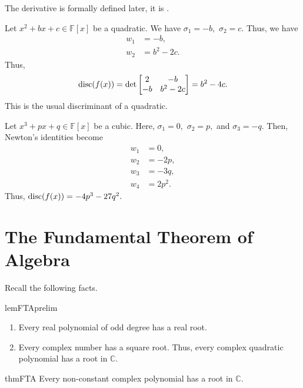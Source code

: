 The derivative is formally defined later, it is .

\begin{ex}
    Let $x^2 + bx + c \in \mathbb{F}[x]$ be a quadratic. We have $\sigma_1 = -b,$ $\sigma_2 = c.$ Thus, we have
    \begin{align*} 
        w_1 &= -b,\\
        w_2 &= b^2 - 2c.
    \end{align*}
    Thus,
    \begin{equation*} 
        \operatorname{disc}(f(x)) = \det\begin{bmatrix}
            2 & -b\\
            -b & b^2 - 2c
        \end{bmatrix} = b^2 - 4c.
    \end{equation*}
    This is the usual discriminant of a quadratic.
\end{ex}

\begin{ex} \label{ex:disccubic}
    Let $x^3 + px + q \in \mathbb{F}[x]$ be a cubic. Here, $\sigma_1 = 0,$ $\sigma_2 = p,$ and $\sigma_3 = -q.$ Then, Newton's identities become
    \begin{align*} 
        w_1 &= 0,\\
        w_2 &= -2p,\\
        w_3 &= -3q,\\
        w_4 &= 2p^2.
    \end{align*}
    Thus, $\operatorname{disc}(f(x)) = -4p^3 - 27q^2.$
\end{ex}

\section{The Fundamental Theorem of Algebra}

Recall the following facts.

\begin{restatable}[]{lem}{FTAprelim}
\label{lem:FTAprelim}
    \phantom{hi}
    \begin{enumerate}
        \item Every real polynomial of odd degree has a real root.
        \item Every complex number has a square root. Thus, every complex quadratic polynomial has a root in $\mathbb{C}.$ \hfill\hyperref[lem:FTAprelim2]{\downsym}
    \end{enumerate} 
\end{restatable}

\begin{restatable}{thm}{FTA}
\label{thm:FTA}
    Every non-constant complex polynomial has a root in $\mathbb{C}.$ \hfill\hyperref[thm:FTA2]{\downsym}
\end{restatable}